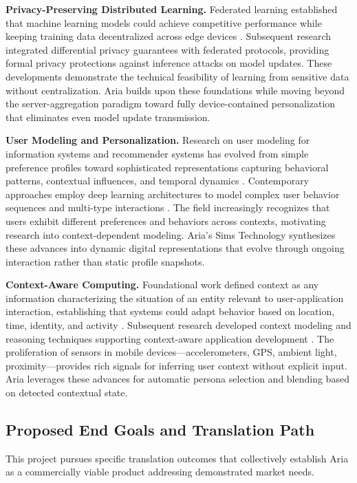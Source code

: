 \documentclass[11pt]{article}
\begin{document}
\textbf{Privacy-Preserving Distributed Learning.} Federated learning established that machine learning models could achieve competitive performance while keeping training data decentralized across edge devices \cite{mcmahan2017communication}. Subsequent research integrated differential privacy guarantees with federated protocols, providing formal privacy protections against inference attacks on model updates. These developments demonstrate the technical feasibility of learning from sensitive data without centralization. Aria builds upon these foundations while moving beyond the server-aggregation paradigm toward fully device-contained personalization that eliminates even model update transmission.

\textbf{User Modeling and Personalization.} Research on user modeling for information systems and recommender systems has evolved from simple preference profiles toward sophisticated representations capturing behavioral patterns, contextual influences, and temporal dynamics \cite{eke2019survey}. Contemporary approaches employ deep learning architectures to model complex user behavior sequences and multi-type interactions \cite{he2023survey}. The field increasingly recognizes that users exhibit different preferences and behaviors across contexts, motivating research into context-dependent modeling. Aria's Sims Technology synthesizes these advances into dynamic digital representations that evolve through ongoing interaction rather than static profile snapshots.

\textbf{Context-Aware Computing.} Foundational work defined context as any information characterizing the situation of an entity relevant to user-application interaction, establishing that systems could adapt behavior based on location, time, identity, and activity \cite{dey2001understanding}. Subsequent research developed context modeling and reasoning techniques supporting context-aware application development \cite{bettini2010survey}. The proliferation of sensors in mobile devices---accelerometers, GPS, ambient light, proximity---provides rich signals for inferring user context without explicit input. Aria leverages these advances for automatic persona selection and blending based on detected contextual state.

\vspace*{-8pt}
\subsection{Proposed End Goals and Translation Path}
\vspace*{-8pt}
This project pursues specific translation outcomes that collectively establish Aria as a commercially viable product addressing demonstrated market needs.
\end{document}
